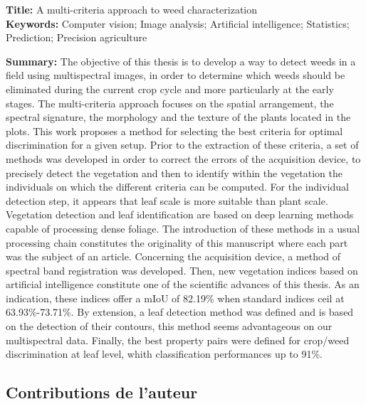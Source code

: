 \documentclass[12pt, a4paper, twoside]{scrbook}
\begin{document}
	\vfill
	\newpage
    \thispagestyle{empty}
    \null
    \vfill
	\begin{framed}
		\noindent  \textbf{Title:} A multi-criteria approach to weed characterization \\[1em]
        \noindent \textbf{Keywords:}  Computer vision; Image analysis; Artificial intelligence; Statistics; Prediction; Precision agriculture
		\begin{multicols}{2}
			\noindent \textbf{Summary:} The objective of this thesis is to develop a way to detect weeds in a field using multispectral images, in order to determine which weeds should be eliminated during the current crop cycle and more particularly at the early stages. The multi-criteria approach focuses on the spatial arrangement, the spectral signature, the morphology and the texture of the plants located in the plots. This work proposes a method for selecting the best criteria for optimal discrimination for a given setup. Prior to the extraction of these criteria, a set of methods was developed in order to correct the errors of the acquisition device, to precisely detect the vegetation and then to identify within the vegetation the individuals on which the different criteria can be computed. For the individual detection step, it appears that leaf scale is more suitable than plant scale. Vegetation detection and leaf identification are based on deep learning methods capable of processing dense foliage. The introduction of these methods in a usual processing chain constitutes the originality of this manuscript where each part was the subject of an article. Concerning the acquisition device, a method of spectral band registration was developed. Then, new vegetation indices based on artificial intelligence constitute one of the scientific advances of this thesis. As an indication, these indices offer a mIoU of 82.19\% when standard indices ceil at 63.93\%-73.71\%. By extension, a leaf detection method was defined and is based on the detection of their contours, this method seems advantageous on our multispectral data. Finally, the best property pairs were defined for crop/weed discrimination at leaf level, whith classification performances up to 91\%.
		\end{multicols}
	\end{framed}
	\vfill
	
	\newpage
	\thispagestyle{empty}
	
	\subsection*{Contributions de l'auteur}
	
\end{document}

